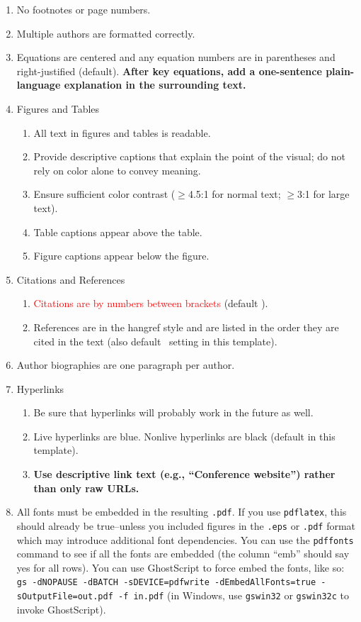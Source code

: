 \documentclass{scspaperproc}
\theoremstyle{scsthe}
\begin{document}
\begin{enumerate}
\begin{enumerate}
	\end{enumerate}
	\item No footnotes or page numbers.
	\item Multiple authors are formatted correctly.
	\item Equations are centered and any equation numbers are in parentheses and right-justified (default). \textbf{After key equations, add a one-sentence plain-language explanation in the surrounding text.}
	\item Figures and Tables
  \begin{enumerate}
	  \item All text in figures and tables is readable.
    \item Provide descriptive captions that explain the point of the visual;    do not rely on color alone to convey meaning.
    \item Ensure sufficient color contrast ($\ge$4.5:1 for normal text;         $\ge$3:1 for large text).
	  \item Table captions appear above the table.
	  \item Figure captions appear below the figure.
	\end{enumerate}
	\item Citations and References
  \begin{enumerate}
	  \item \textcolor{red}{Citations are by numbers between brackets} (default \BibTeX). 
	  \item References are in the hangref style and are listed in the order they are cited in the text (also default \BibTeX\ setting in this template). 
	\end{enumerate}
	\item Author biographies are one paragraph per author.
	\item Hyperlinks
  \begin{enumerate}
	  \item Be sure that hyperlinks will probably work in the future as well.
	  \item Live hyperlinks are blue. Nonlive hyperlinks are black (default in this template).
    \item \textbf{Use descriptive link text (e.g., “Conference website”) rather than only raw URLs.}
	\end{enumerate}
	\item All fonts must be embedded in the resulting \texttt{.pdf}. If you use \texttt{pdflatex}, this should already be true--unless you included figures in the \texttt{.eps} or \texttt{.pdf} format which may introduce additional font dependencies. You can use the \texttt{pdffonts} command to see if all the fonts are embedded (the column ``emb'' should say yes for all rows). You can use GhostScript to force embed the fonts, like so: {\texttt{gs -dNOPAUSE -dBATCH -sDEVICE=pdfwrite -dEmbedAllFonts=true -sOutputFile=out.pdf -f in.pdf}} (in Windows, use \texttt{gswin32} or \texttt{gswin32c} to invoke GhostScript).
\end{enumerate}
\end{document}
